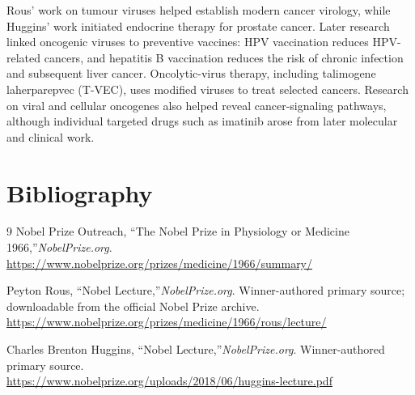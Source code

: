 Rous' work on tumour viruses helped establish modern cancer virology, while Huggins' work initiated endocrine therapy for prostate cancer. Later research linked oncogenic viruses to preventive vaccines: HPV vaccination reduces HPV-related cancers, and hepatitis B vaccination reduces the risk of chronic infection and subsequent liver cancer. Oncolytic-virus therapy, including talimogene laherparepvec (T-VEC), uses modified viruses to treat selected cancers. Research on viral and cellular oncogenes also helped reveal cancer-signaling pathways, although individual targeted drugs such as imatinib arose from later molecular and clinical work.


\section{Bibliography}

\begin{thebibliography}{9}
Nobel Prize Outreach, ``The Nobel Prize in Physiology or Medicine 1966,''\emph{NobelPrize.org}.\\
\url{https://www.nobelprize.org/prizes/medicine/1966/summary/}

Peyton Rous, ``Nobel Lecture,''\emph{NobelPrize.org}. Winner-authored primary source; downloadable from the official Nobel Prize archive.\\
\url{https://www.nobelprize.org/prizes/medicine/1966/rous/lecture/}

Charles Brenton Huggins, ``Nobel Lecture,''\emph{NobelPrize.org}. Winner-authored primary source.\\
\url{https://www.nobelprize.org/uploads/2018/06/huggins-lecture.pdf}
\end{thebibliography}
